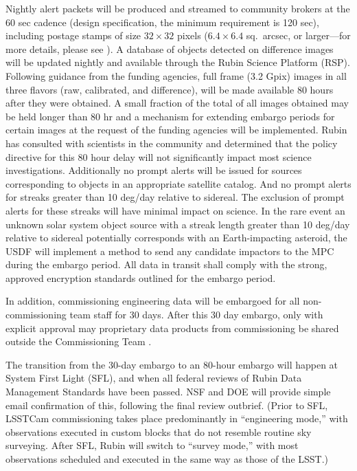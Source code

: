 Nightly alert packets will be produced and streamed to community brokers at the 60 sec cadence (design specification, the minimum requirement is 120 sec), including postage stamps of size $32 \times 32$ pixels ($6.4 \times 6.4$ sq.\ \gls{arcsec}, or larger---for more details, please see ).
A database of objects detected on difference images will be updated nightly and available through the Rubin Science Platform (\gls{RSP}).
Following guidance from the funding agencies, full frame (3.2 Gpix) images in all three flavors (raw, calibrated, and difference), will be made available 80 hours after they were obtained.
A small fraction of the total of all images obtained may be held longer than 80 hr and a mechanism for extending embargo periods for certain images at the request of the funding agencies will be implemented.
Rubin has consulted with scientists in the community and determined that the policy directive for this 80 hour delay will not significantly impact most science investigations.
Additionally no prompt alerts will be issued for sources corresponding to objects in an appropriate satellite catalog.
And no prompt alerts for streaks greater than 10 \gls{deg}/day relative to sidereal.
The exclusion of prompt alerts for these streaks will have minimal impact on science.
In the rare event an unknown solar system object source with a streak length greater than 10 \gls{deg}/day relative to sidereal potentially corresponds with an Earth-impacting asteroid, the \gls{USDF} will implement a method to send any candidate impactors to the \gls{MPC} during the embargo period.
All data in transit shall comply with the strong, approved encryption standards outlined for the embargo period.

In addition, commissioning engineering data will be embargoed for all non-commissioning team staff for 30 days.
After this 30 day embargo, only with explicit approval may proprietary data products from commissioning be shared outside the \gls{Commissioning} Team  .

The transition from the 30-day embargo to an 80-hour embargo will happen at System First Light (SFL), and when all federal reviews of Rubin Data Management Standards have been passed. 
NSF and DOE will provide simple email confirmation of this, following the final review outbrief.
(Prior to SFL, LSSTCam commissioning takes place predominantly in ``engineering mode,'' with observations executed in custom blocks that do not resemble routine sky surveying. 
After SFL, Rubin will switch to ``survey mode,'' with most observations scheduled and executed in the same way as those of the LSST.)  

